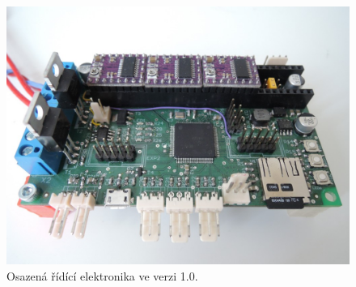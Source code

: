 \begin{figure}[h!]

  \centering
    \includegraphics[width=0.8\linewidth]{obrazky/DSCN2185.JPG}%
    \caption{Osazená řídící elektronika ve verzi 1.0.}
\end{figure}


